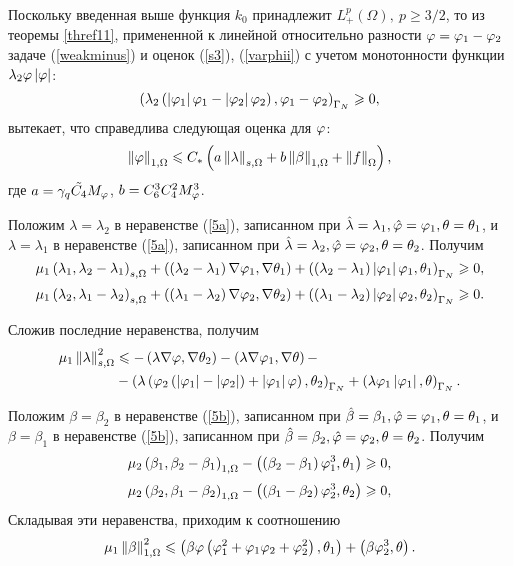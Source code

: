 Поскольку введенная выше функция $k_0$ принадлежит $L^p_+ (\Omega), ~ p \ge 3/2$, то из теоремы \ref{thref11}, примененной к линейной относительно разности $\varphi = \varphi_1 - \varphi_2$ задаче (\ref{weakminus}) и оценок (\ref{s3}), (\ref{varphii}) с учетом монотонности функции $\lambda_2 \varphi \left\vert \varphi \right\vert$:
\[
    \left( \lambda_2 \left( \left\vert \varphi_1 \right\vert \varphi_1 - \left\vert \varphi_2 \right\vert \varphi_2 \right), \varphi_1 - \varphi_2 \right)_{\Gamma_N} \geqslant 0,
\]
вытекает, что справедлива следующая оценка для $\varphi$:
\begin{equation}
    \label{varphiest}
    \left\Vert \varphi \right\Vert_{1, \Omega} \leqslant C_{*} \left( 
        a \left\Vert \lambda \right\Vert_{s,\Omega} 
        + b \left\Vert \beta \right\Vert_{1,\Omega} 
        + \left\Vert f \right\Vert_\Omega
     \right),  
\end{equation} 
где $a = \gamma_q \tilde{C_4} M_\varphi$, $b = C_6^3 C_4^2 M_{\varphi}^3$.

Положим $\lambda = \lambda_2$ в неравенстве (\ref{5a}), записанном при $\hat \lambda = \lambda_1, \hat {\varphi} = \varphi_1, \theta = \theta_1$, и $\lambda = \lambda_1$ в неравенстве (\ref{5a}), записанном при $\hat \lambda = \lambda_2, \hat {\varphi} = \varphi_2, \theta = \theta_2$. Получим 
\[
    \mu_1 
    \left( \lambda_1, \lambda_2 - \lambda_1 \right)_{s,\Omega} 
    + \left(  \left( \lambda_2 - \lambda_1 \right) \nabla \varphi_1, \nabla \theta_1 \right) 
    + \left(  \left( \lambda_2 - \lambda_1 \right) \left\vert \varphi_1 \right\vert \varphi_1, \theta_1 \right)_{\Gamma_N} 
    \geqslant 0, 
\]
\[
    \mu_1 
    \left( \lambda_2, \lambda_1 - \lambda_2 \right)_{s,\Omega} 
    + \left(  \left( \lambda_1 - \lambda_2 \right) \nabla \varphi_2, \nabla \theta_2 \right) 
    + \left(  \left( \lambda_1 - \lambda_2 \right) \left\vert \varphi_2 \right\vert \varphi_2, \theta_2 \right)_{\Gamma_N} 
    \geqslant 0.
\]

Сложив последние неравенства, получим
\begin{equation}
    \label{lam}
    \begin{split}
        \mu_1 
        \left\Vert \lambda \right\Vert^2_{s,\Omega} &\leqslant 
        - \left( \lambda \nabla \varphi, \nabla \theta_2 \right) 
        - \left( \lambda \nabla \varphi_1, \nabla \theta \right) - \\
        &- \left( \lambda 
            \left( 
                \varphi_2 \left( \left\vert \varphi_1 \right\vert - \left\vert \varphi_2 \right\vert \right)
                + \left\vert \varphi_1 \right\vert \varphi
             \right), \theta_2
         \right)_{\Gamma_N} 
        + \left( \lambda \varphi_1 \left\vert \varphi_1 \right\vert, \theta \right)_{\Gamma_N}.
    \end{split}
\end{equation}

Положим $\beta = \beta_2$ в неравенстве (\ref{5b}), записанном при $\hat \beta = \beta_1, \hat {\varphi} = \varphi_1, \theta = \theta_1$, и $\beta = \beta_1$ в неравенстве (\ref{5b}), записанном при $\hat \beta = \beta_2, \hat {\varphi} = \varphi_2, \theta = \theta_2$. Получим 
\[
    \mu_2 \left( \beta_1, \beta_2 - \beta_1 \right)_{1,\Omega} 
    - \left(  \left( \beta_2 - \beta_1 \right) \varphi_1^3, \theta_1 \right) \geqslant 0,
\]
\[
    \mu_2 \left( \beta_2, \beta_1 - \beta_2 \right)_{1,\Omega} 
    - \left(  \left( \beta_1 - \beta_2 \right) \varphi_2^3, \theta_2 \right) \geqslant 0,
\]
Складывая эти неравенства, приходим к соотношению 
\begin{equation}
    \label{prmin}
    \mu_1 \left\Vert \beta \right\Vert^2_{1,\Omega} \leqslant 
    \left(  
        \beta \varphi 
        \left( \varphi_1^2 + \varphi_1 \varphi_2 + \varphi_2^2 \right), 
        \theta_1
     \right)
    + \left( \beta \varphi_2^3, \theta \right).
\end{equation}

